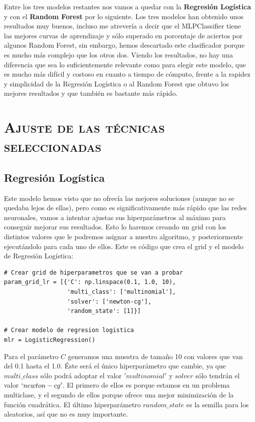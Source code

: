 \documentclass[11pt,a4paper]{article}
\begin{document}
Entre los tres modelos restantes nos vamos a quedar con la \textbf{Regresión Logística} y con el \textbf{Random Forest} por lo siguiente. Los tres modelos han obtenido unos resultados muy buenos, incluso me atrevería a decir que el MLPClassifier tiene las mejores curvas de aprendizaje y sólo superado en porcentaje de aciertos por algunos Random Forest, sin embargo, hemos descartado este clasificador porque es mucho más complejo que los otros dos. Viendo los resultados, no hay una diferencia que sea lo suficientemente relevante como para elegir este modelo, que es mucho más difícil y costoso en cuanto a tiempo de cómputo, frente a la rapidez y simplicidad de la Regresión Logística o al Random Forest que obtuvo los mejores resultados y que también es bastante más rápido.

\newpage

\section{\textsc{Ajuste de las técnicas seleccionadas}}

\subsection{Regresión Logística}

Este modelo hemos visto que no ofrecía las mejores soluciones (aunque no se quedaba lejos de ellas), pero como es significativamente más rápido que las redes neuronales, vamos a intentar ajustas sus hiperparámetros al máximo para conseguir mejorar sus resultados. Esto lo haremos creando un grid con los distintos valores que le podremos asignar a nuestro algoritmo, y posteriormente ejecutándolo para cada uno de ellos. Este es código que crea el grid y el modelo de Regresión Logística:

\begin{lstlisting}
# Crear grid de hiperparametros que se van a probar
param_grid_lr = [{'C': np.linspace(0.1, 1.0, 10),
                  'multi_class': ['multinomial'],
                  'solver': ['newton-cg'],
                  'random_state': [1]}]

# Crear modelo de regresion logistica
mlr = LogisticRegression()
\end{lstlisting}

Para el parámetro $C$ generamos una muestra de tamaño 10 con valores que van del 0.1 hasta el 1.0. Éste será el único hiperparámetro que cambie, ya que $multi\_class$ sólo podrá adoptar el valor $'multinomial'$ y $solver$ sólo tendrán el valor $`newton-cg'$. El primero de ellos es porque estamos en un problema multiclase, y el segundo de ellos porque ofrece una mejor minimización de la función cuadrática. El último hiperparámetro $random\_state$ es la semilla para los aleatorios, así que no es muy importante.
\end{document}
